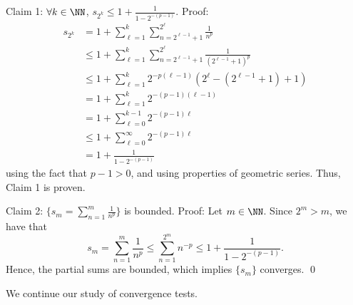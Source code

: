 Claim 1: $\forall k\in \NN$, 
$s_{2^k} \leq 1 + \frac{1}{1-2^{-(p-1)}}$. Proof:
\begin{align*}
    s_{2^k} &= 1+ \sum_{\ell=1}^k \sum_{n=2^{\ell-1}+1}^{2^\ell} \frac{1}{n^p} \\
    &\leq 1+ \sum_{\ell=1}^k \sum_{n=2^{\ell-1}+1}^{2^\ell} \frac{1}{(2^{\ell-1}+1)^p} \\
    &\leq 1+ \sum_{\ell=1}^k 2^{-p(\ell-1)}(2^\ell-(2^{\ell-1}+1)+1) \\
    &= 1+ \sum_{\ell=1}^k 2^{-(p-1)(\ell-1)} \\
    &= 1+ \sum_{\ell=0}^{k-1} 2^{-(p-1)\ell} \\
    &\leq 1+ \sum_{\ell=0}^\infty 2^{-(p-1)\ell} \\
    &= 1 + \frac{1}{1-2^{-(p-1)}}
\end{align*}
using the fact that $p-1>0$, and using properties of geometric series. Thus, Claim 1 is proven. 

Claim 2: $\{s_m = \sum_{n=1}^m \frac{1}{n^p}\}$ is bounded. Proof: Let $m\in\NN$. Since $2^m >m$, we have that 
\[
s_m = \sum_{n=1}^m \frac{1}{n^p} \leq \sum_{n=1}^{2^m}n^{-p} \leq 1 + \frac{1}{1-2^{-(p-1)}}.
\]
Hence, the partial sums are bounded, which implies $\{s_m\}$ converges. \qed


\noindent We continue our study of convergence tests.

